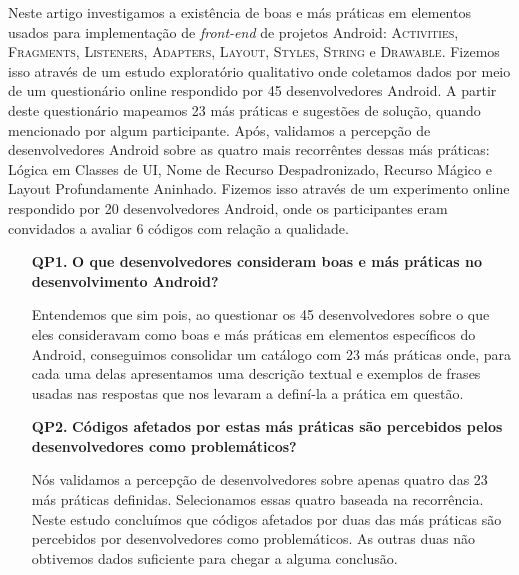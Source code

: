 Neste artigo investigamos a existência de boas e más práticas em elementos usados para implementação de \textit{front-end} de projetos Android: \textsc{Activities}, \textsc{Fragments}, \textsc{Listeners}, \textsc{Adapters}, \textsc{Layout}, \textsc{Styles}, \textsc{String} e \textsc{Drawable}. Fizemos isso através de um estudo exploratório qualitativo onde coletamos dados por meio de um questionário online respondido por 45 desenvolvedores Android. A partir deste questionário mapeamos 23 más práticas e sugestões de solução, quando mencionado por algum participante. Após, validamos a percepção de desenvolvedores Android sobre as quatro mais recorrêntes dessas más práticas: Lógica em Classes de UI, Nome de Recurso Despadronizado, Recurso Mágico e Layout Profundamente Aninhado. Fizemos isso através de um experimento online respondido por 20 desenvolvedores Android, onde os participantes eram convidados a avaliar 6 códigos com relação a qualidade.

\begin{itemize}
	\item[\textbf{QP1.}] \textbf{O que desenvolvedores consideram boas e más práticas no desenvolvimento Android?} 

	Entendemos que sim pois, ao questionar os 45 desenvolvedores sobre o que eles consideravam como boas e más práticas em elementos específicos do Android, conseguimos consolidar um catálogo com 23 más práticas onde, para cada uma delas apresentamos uma descrição textual e exemplos de frases usadas nas respostas que nos levaram a definí-la a prática em questão. 

	\item[\textbf{QP2.}] \textbf{Códigos afetados por estas más práticas são percebidos pelos desenvolvedores como problemáticos?}

	Nós validamos a percepção de desenvolvedores sobre apenas quatro das 23 más práticas definidas. Selecionamos essas quatro baseada na recorrência. Neste estudo concluímos que códigos afetados por duas das más práticas são percebidos por desenvolvedores como problemáticos. As outras duas não obtivemos dados suficiente para chegar a alguma conclusão.
\end{itemize}


